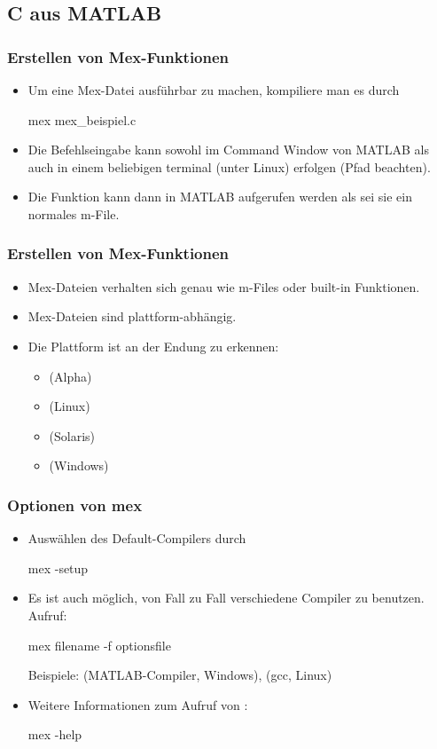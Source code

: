 \documentclass[hyperref={xetex}]{beamer}
\begin{document}
\subsection{C aus MATLAB}
%
%
\begin{frame}[fragile]\frametitle{Erstellen von Mex-Funktionen}
\begin{itemize}
\item Um eine Mex-Datei  ausf\"uhrbar zu machen, kompiliere
man es durch 
\begin{matlabin}
mex mex_beispiel.c
\end{matlabin}
\item Die Befehlseingabe kann sowohl im Command Window von  MATLAB als auch in einem beliebigen
  terminal (unter Linux) erfolgen (Pfad beachten).
\item Die Funktion kann dann in MATLAB aufgerufen werden als sei sie ein normales
m-File.
\end{itemize}
\end{frame}
%
%
\begin{frame}[fragile]\frametitle{Erstellen von Mex-Funktionen}
\begin{itemize}
\item Mex-Dateien verhalten sich genau wie m-Files oder built-in Funktionen.
\item Mex-Dateien sind plattform-abh\"angig.
\item Die Plattform ist an der Endung zu erkennen:
\begin{itemize}
 \item {} (Alpha)
\item {} (Linux)
\item {} (Solaris)
\item {} (Windows)
\end{itemize}
\end{itemize}
\end{frame}
%
%
\begin{frame}[fragile]\frametitle{Optionen von mex}
\begin{itemize}
\item Ausw\"ahlen des Default-Compilers durch
\begin{matlabin}
mex -setup
\end{matlabin}
\item Es ist auch m\"oglich, von Fall zu Fall verschiedene Compiler zu
  benutzen. Aufruf:
\begin{matlabin}
mex filename -f optionsfile
\end{matlabin}
Beispiele:  (MATLAB-Compiler, Windows),
 (gcc, Linux) 
\item Weitere Informationen zum Aufruf von :
\begin{matlabin}
mex -help
\end{matlabin}
\end{itemize}
\end{frame}
%
\end{document}
